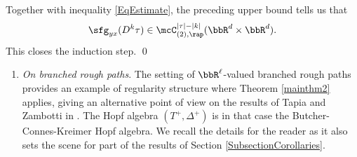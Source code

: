 Together with inequality \eqref{EqEstimate}, the preceding upper bound tells us that\vspace*{-3pt}
\[
{\sfg}_{yx}(D^k\tau)\in\mcC^{|\tau|-|k|}_{(2),\rap}(\bbR^d\times\bbR^d).
\]
This closes the induction step. \qed

\skpt
\begin{remarks*}
\begin{enumerate}
\item
\emph{On branched rough paths}. The setting of $\bbR^\ell$-valued branched rough paths provides an example of regularity structure where Theorem \ref{mainthm2} applies, giving an alternative point of view on the results of Tapia and Zambotti in \cite{TZ18}. The Hopf algebra $(T^+,\Delta^+)$ is in that case the Butcher-Connes-Kreimer Hopf algebra. We recall the details for the reader as it also sets the scene for part of the results of Section \ref{SubsectionCorollaries}.


\end{enumerate}
\end{remarks*}
